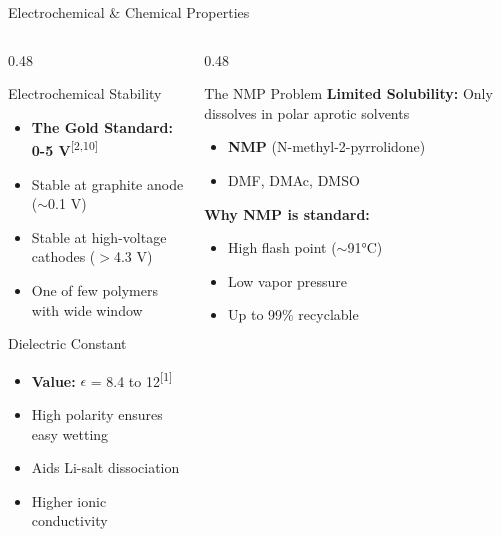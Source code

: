 \documentclass[aspectratio=169]{beamer}
\begin{document}
\begin{frame}{Electrochemical \& Chemical Properties}
    \begin{columns}[T]
        \begin{column}{0.48\textwidth}
            \begin{block}{Electrochemical Stability}
                \begin{itemize}\small
                    \item \textbf{The Gold Standard: 0-5 V}\textsuperscript{[2,10]}
                    \item Stable at graphite anode ($\sim$0.1 V)
                    \item Stable at high-voltage cathodes ($>$4.3 V)
                    \item One of few polymers with wide window
                \end{itemize}
            \end{block}
            
            \begin{block}{Dielectric Constant}
                \begin{itemize}\small
                    \item \textbf{Value:} $\epsilon$ = 8.4 to 12\textsuperscript{[1]}
                    \item High polarity ensures easy wetting
                    \item Aids Li-salt dissociation
                \item Higher ionic conductivity
                \end{itemize}
            \end{block}
        \end{column}
        
        \begin{column}{0.48\textwidth}
            \begin{alertblock}{The NMP Problem}
                \textbf{Limited Solubility:} Only dissolves in polar aprotic solvents
                \begin{itemize}\small
                    \item \textbf{NMP} (N-methyl-2-pyrrolidone)
                    \item DMF, DMAc, DMSO
                \end{itemize}
                
                \vspace{0.1cm}
                \textbf{Why NMP is standard:}
                \begin{itemize}\small
                    \item High flash point ($\sim$91\si{\celsius})
                    \item Low vapor pressure
                    \item Up to 99\% recyclable
                \end{itemize}
                

\end{alertblock}
\end{column}
\end{columns}
\end{frame}
\end{document}
